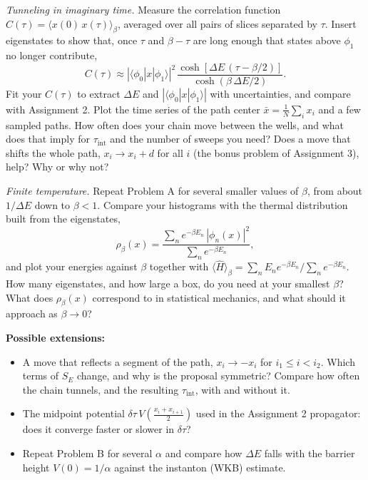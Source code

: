 \begin{problem}
  \emph{Tunneling in imaginary time.}
  Measure the correlation function $C(\tau) = \langle x(0)\,x(\tau)\rangle_\beta$, averaged over all pairs of slices separated by $\tau$.
  Insert eigenstates to show that, once $\tau$ and $\beta-\tau$ are long enough that states above $\phi_1$ no longer contribute,
  \begin{equation}
    C(\tau) \approx |\langle\phi_0|x|\phi_1\rangle|^2\,\frac{\cosh\left[\Delta E\,(\tau-\beta/2)\right]}{\cosh(\beta\,\Delta E/2)}.
  \end{equation}
  Fit your $C(\tau)$ to extract $\Delta E$ and $|\langle\phi_0|x|\phi_1\rangle|$ with uncertainties, and compare with Assignment 2.
  Plot the time series of the path center $\bar x = \frac{1}{N}\sum_i x_i$ and a few sampled paths.
  How often does your chain move between the wells, and what does that imply for $\tau_\mathrm{int}$ and the number of sweeps you need?
  Does a move that shifts the whole path, $x_i \to x_i + d$ for all $i$ (the bonus problem of Assignment 3), help? Why or why not?
\end{problem}

\begin{problem}
  \emph{Finite temperature.}
  Repeat Problem A for several smaller values of $\beta$, from about $1/\Delta E$ down to $\beta < 1$.
  Compare your histograms with the thermal distribution built from the eigenstates,
  \begin{equation}
    \rho_\beta(x) = \frac{\sum_n e^{-\beta E_n}\,|\phi_n(x)|^2}{\sum_n e^{-\beta E_n}},
  \end{equation}
  and plot your energies against $\beta$ together with $\langle\hat H\rangle_\beta = \sum_n E_n e^{-\beta E_n}/\sum_n e^{-\beta E_n}$.
  How many eigenstates, and how large a box, do you need at your smallest $\beta$?
  What does $\rho_\beta(x)$ correspond to in statistical mechanics, and what should it approach as $\beta\to 0$?
\end{problem}

\noindent\textbf{Possible extensions:}
\begin{itemize}
  \item A move that reflects a segment of the path, $x_i \to -x_i$ for $i_1 \leq i < i_2$.
        Which terms of $S_E$ change, and why is the proposal symmetric?
        Compare how often the chain tunnels, and the resulting $\tau_\mathrm{int}$, with and without it.
  \item The midpoint potential $\delta\tau\,V\!\left(\frac{x_i+x_{i+1}}{2}\right)$ used in the Assignment 2 propagator: does it converge faster or slower in $\delta\tau$?
  \item Repeat Problem B for several $\alpha$ and compare how $\Delta E$ falls with the barrier height $V(0) = 1/\alpha$ against the instanton (WKB) estimate.
\end{itemize}


